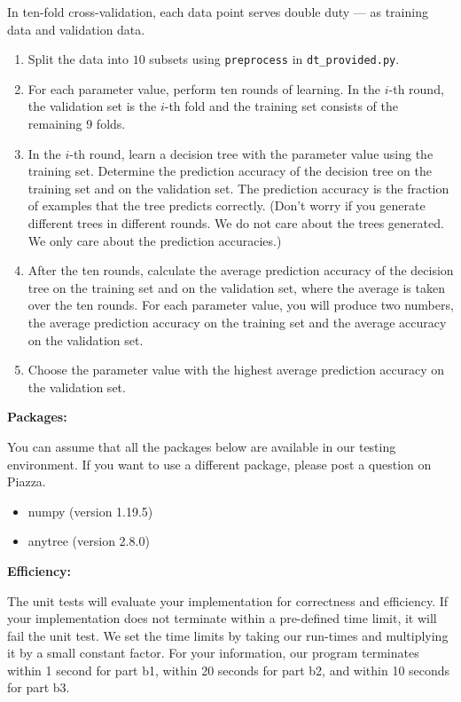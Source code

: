 \documentclass[12pt]{article}
\begin{document}
In ten-fold cross-validation, each data point serves double duty --- as training data and validation data. 
\begin{enumerate}

\item 
Split the data into $10$ subsets using \verb+preprocess+ in \verb+dt_provided.py+.

\item 
For each parameter value, perform ten rounds of learning. In the $i$-th round, the validation set is the $i$-th fold and the training set consists of the remaining $9$ folds.

\item 
In the $i$-th round, learn a decision tree with the parameter value using the training set. Determine the prediction accuracy of the decision tree on the training set and on the validation set. The prediction accuracy is the fraction of examples that the tree predicts correctly. (Don't worry if you generate different trees in different rounds. We do not care about the trees generated. We only care about the prediction accuracies.)

\item 
After the ten rounds, calculate the average prediction accuracy of the decision tree on the training set and on the validation set, where the average is taken over the ten rounds. For each parameter value, you will produce two numbers, the average prediction accuracy on the training set and the average accuracy on the validation set. 
 
\item 
Choose the parameter value with the highest average prediction accuracy on the validation set. 
\end{enumerate}

{\bf Packages: }

You can assume that all the packages below are available in our testing environment. If you want to use a different package, please post a question on Piazza.
%
\begin{itemize}
\item numpy (version 1.19.5)
\item anytree (version 2.8.0)
\end{itemize}


{\bf Efficiency: }

The unit tests will evaluate your implementation for correctness and efficiency. If your implementation does not terminate within a pre-defined time limit, it will fail the unit test. We set the time limits by taking our run-times and multiplying it by a small constant factor. For your information, our program terminates within 1 second for part b1, within 20 seconds for part b2, and within 10 seconds for part b3.
\end{document}
